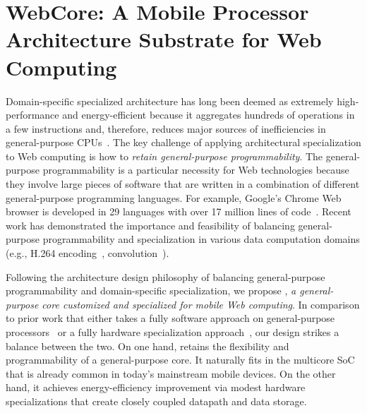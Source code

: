 
\chapter{WebCore: A Mobile Processor Architecture Substrate for Web Computing}
\label{sec:arch}

Domain-specific specialized architecture has long been deemed as extremely high-performance and energy-efficient because it aggregates hundreds of operations in a few instructions and, therefore, reduces major sources of inefficiencies in general-purpose CPUs~\cite{h264,soda,anysp}. The key challenge of applying architectural specialization to Web computing is how to \textit{retain general-purpose programmability}. The general-purpose programmability is a particular necessity for Web technologies because they involve large pieces of software that are written in a combination of different general-purpose programming languages. For example, Google's Chrome Web browser is developed in 29 languages with over 17 million lines of code~\cite{chromeloc}. Recent work has demonstrated the importance and feasibility of balancing general-purpose programmability and specialization in various data computation domains (e.g., H.264 encoding~\cite{h264}, convolution~\cite{ce}).


Following the architecture design philosophy of balancing general-purpose programmability and domain-specific specialization, we propose \webcore, \textit{a general-purpose core customized and specialized for mobile Web computing}. In comparison to prior work that either takes a fully software approach on general-purpose processors~\cite{zoomm,ParallelBrowser} or a fully hardware specialization approach~\cite{SiChrome}, our design strikes a balance between the two. On one hand, \webcore retains the flexibility and programmability of a general-purpose core. It naturally fits in the multicore SoC that is already common in today's mainstream mobile devices. On the other hand, it achieves energy-efficiency improvement via modest hardware specializations that create closely coupled datapath and data storage.

